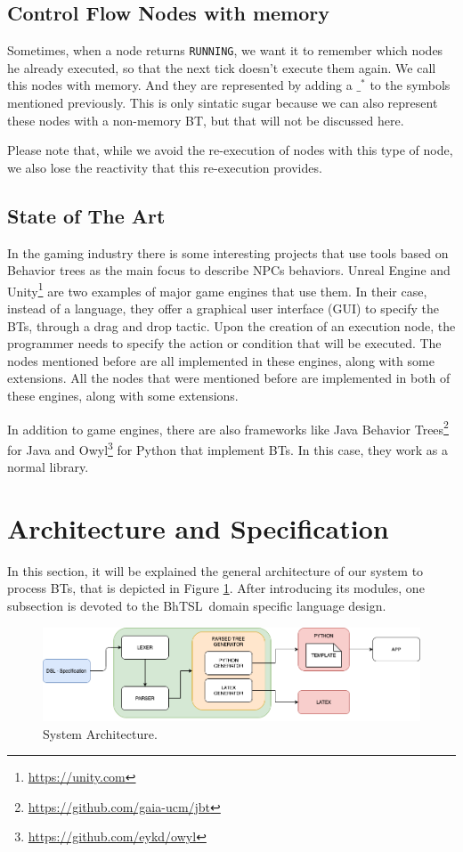 \documentclass[a4paper,UKenglish,cleveref, autoref, thm-restate]{oasics-v2019}
\def\bht{BhTSL}
\begin{document}
\subsection{Control Flow Nodes with memory}
Sometimes, when a node returns \texttt{RUNNING}, we want it to remember which nodes he already executed, so that the next tick doesn't execute them again.
We call this nodes with memory.
And they are represented by adding a $\_^*$ to the symbols mentioned previously.
This is only sintatic sugar because we can also represent these nodes with a non-memory BT, but that will not be discussed here.

Please note that, while we avoid the re-execution of nodes with this type of node, we also lose the reactivity that this re-execution provides.

\subsection{State of The Art}
\label{subsec:state-of-the-art}
In the gaming industry there is some interesting projects that use tools based on Behavior trees as the main focus to describe NPCs behaviors.
Unreal Engine \cite{UnrealEngine} and Unity\footnote{\raggedright\url{https://unity.com}} are two examples of major game engines that use them.
In their case, instead of a language, they offer a graphical user interface (GUI) to specify the BTs, through a drag and drop tactic.
Upon the creation of an execution node, the programmer needs to specify the action or condition that will be executed.
The nodes mentioned before are all implemented in these engines, along with some extensions.
All the nodes that were mentioned before are implemented in both of these engines, along with some extensions.

In addition to game engines, there are also frameworks like Java Behavior Trees\footnote{\url{https://github.com/gaia-ucm/jbt}} for Java and Owyl\footnote{\url{https://github.com/eykd/owyl}} for Python that implement BTs.
In this case, they work as a normal library.

\section{Architecture and Specification}
\label{sec:arc-spec}
In this section, it will be explained the general architecture of our system to process BTs, 
that is depicted in Figure \ref{fig:architecture}. 
After introducing its modules, one subsection is devoted to the \bht\ domain specific language design.
\begin{figure}[H]
    \includegraphics[width=\columnwidth]{architecture.png}
    \caption{System Architecture.}
    \label{fig:architecture}
\end{figure}
\end{document}
